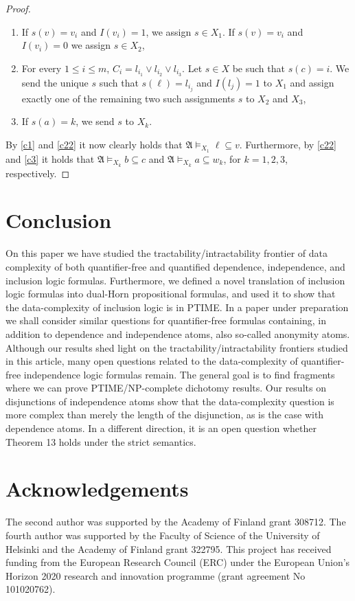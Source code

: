 \documentclass{article}
\theoremstyle{plain}
\theoremstyle{definition}
\newcommand{\mA}{{\mathfrak A}}
\begin{document}
\begin{proof}
		\begin{enumerate}
		    \item\label{c1}  If $ s(v) = v_i$ and $I(v_i) = 1$, we assign $s \in X_1$. If $ s(v) = v_i$ and $I(v_i) = 0$ we assign $s \in  X_2$,
		    \item\label{c22} 	For every $1 \leq i \leq m$, $C_i = l_{i_1} \vee l_{i_2} \vee l_{i_3}$. Let $s \in X$ be such that $ s(c) = i$. We send the unique $s$ such that $s(\ell) = l_{i_j}$ and $I(l_j)=1$ to $X_1$ and assign exactly one of the remaining two such assignments $s$ to $X_2$ and $X_3$,\item\label{c3} If $s(a) = k$,  we send $s$ to $X_k$. 
		\end{enumerate}
		 By \eqref{c1} and \eqref{c22} it now  clearly holds that  $\mA \models_{X_1} \ell \subseteq v$. Furthermore, by \eqref{c22} and \eqref{c3} it holds that $\mA \models_{X_k} b \subseteq c$ and    $\mA \models_{X_k} a \subseteq w_k$, for  $k = 1,2,3$, respectively.


		
		
		
\end{proof}



\section{Conclusion}
On this paper we have studied the  tractability/intractability frontier  of data complexity of both quantifier-free and quantified  dependence, independence, and inclusion logic formulas. Furthermore, we defined a novel translation of  inclusion logic formulas into dual-Horn propositional formulas, and used it to show that the data-complexity of inclusion logic is in PTIME. In a paper under preparation we shall consider similar questions for quantifier-free formulas containing, in addition to dependence and independence atoms, also so-called anonymity atoms.
Although our results shed light on the tractability/intractability frontiers studied in this article, many open  questions related to the data-complexity of quantifier-free independence logic formulas remain. The general goal is to find fragments where we can prove PTIME/NP-complete dichotomy results. Our results on disjunctions of independence atoms show that the data-complexity question is more complex than merely the length of the disjunction, as is the case with dependence atoms. In a different direction,  it is an open question whether Theorem 13 holds under the strict semantics. 


\section*{Acknowledgements}
The second author was supported by the Academy of Finland grant 308712. The fourth author was supported by the Faculty of Science of the University of Helsinki and the Academy of Finland grant 322795. This project has received funding from the European Research Council (ERC) under the European Union’s Horizon 2020 research and innovation programme (grant agreement No 101020762).


\end{document}
